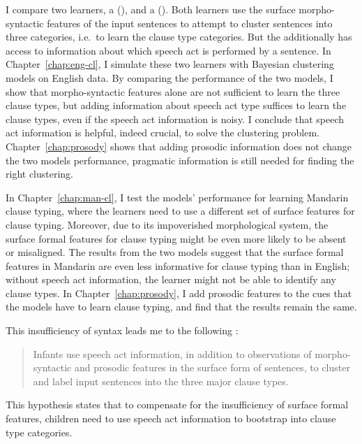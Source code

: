 I compare two learners, a \distlearner{} (\dlearnerabbr{}), and a \praglearner{} (\plearnerabbr{}). Both learners use the surface morpho-syntactic features of the input sentences to attempt to cluster sentences into three categories, i.e.\ to learn the clause type categories. But the \plearnerabbr{} additionally has access to information about which speech act is performed by a sentence. In Chapter~\ref{chap:eng-cl}, I simulate these two learners with Bayesian clustering models on English data. By comparing the performance of the two models, I show that morpho-syntactic features alone are not sufficient to learn the three clause types, but adding information about speech act type suffices to learn the clause types, even if the speech act information is noisy. I conclude that speech act information is helpful, indeed crucial, to solve the clustering problem. Chapter~\ref{chap:prosody} shows that adding prosodic information does not change the two models performance, pragmatic information is still needed for finding the right clustering.

In Chapter~\ref{chap:man-cl}, I test the models' performance for learning Mandarin clause typing, where the learners need to use a different set of surface features for clause typing. Moreover, due to its impoverished morphological system, the surface formal features for clause typing might be even more likely to be absent or misaligned. The results from the two models suggest that the surface formal features in Mandarin are even less informative for clause typing than in English; without speech act information, the learner might not be able to identify any clause types. In Chapter~\ref{chap:prosody}, I add prosodic features to the cues that the models have to learn clause typing, and find that the results remain the same.

This insufficiency of syntax leads me to the following \tbf{\subhypos{}}:
\begin{quote}
Infants use speech act information, in addition to observations of morpho-syntactic and prosodic features in the surface form of sentences, to cluster and label input sentences into the three major clause types.
\end{quote}


This hypothesis states that to compensate for the insufficiency of surface formal features, children need to use speech act information to bootstrap into clause type categories.



